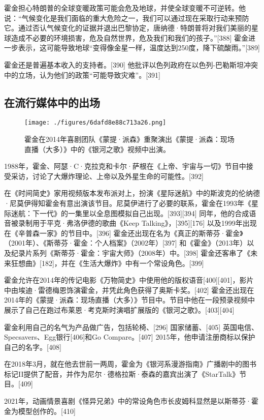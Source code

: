 霍金担心特朗普的全球变暖政策可能会危及地球，并使全球变暖不可逆转。他说：“气候变化是我们面临的重大危险之一，我们可以通过现在采取行动来预防它。通过否认气候变化的证据并退出巴黎协定，唐纳德·特朗普将对我们美丽的星球造成不必要的环境损害，危及自然世界，危及我们和我们的孩子。”[388] 霍金进一步表示，这可能导致地球“变得像金星一样，温度达到250度，降下硫酸雨。”[389]

霍金还是普遍基本收入的支持者。[390] 他批评以色列政府在以色列-巴勒斯坦冲突中的立场，认为他们的政策“可能导致灾难”。[391]
\subsection{在流行媒体中的出场}
\begin{figure}[ht]
\centering
\texttt{[image: ./figures/6dafd8e88c713a26.png]}
\caption{霍金在2014年喜剧团队《蒙提·派森》重聚演出《蒙提·派森：现场直播（大多）》中的《银河之歌》视频中出演。} \label{fig_HJ_9}
\end{figure}
1988年，霍金、阿瑟·C·克拉克和卡尔·萨根在《上帝、宇宙与一切》节目中接受采访，讨论了大爆炸理论、上帝以及外星生命的可能性。[392]

在《时间简史》家用视频版本发布派对上，扮演《星际迷航》中的斯波克的伦纳德·尼莫伊得知霍金有意出演该节目。尼莫伊进行了必要的联系，霍金在1993年《星际迷航：下一代》的一集里以全息图模拟自己出现。[393][394] 同年，他的合成语音被录制用于平克·弗洛伊德的歌曲《Keep Talking》，[395][176] 以及1999年出现在《辛普森一家》的节目中。[396] 霍金还出现在名为《真正的斯蒂芬·霍金》（2001年）、《斯蒂芬·霍金：个人档案》（2002年）[397] 和《霍金》（2013年）以及纪录片系列《斯蒂芬·霍金：宇宙大师》（2008年）中。[398] 霍金还客串了《未来狂想曲》[182]，并在《生活大爆炸》中有一个常设角色。[399]

霍金允许在2014年的传记电影《万物简史》中使用他的版权语音[400][401]，影片中由埃迪·雷德梅恩饰演霍金，并凭此角色获得了奥斯卡奖。[402] 霍金还出现在2014年的《蒙提·派森：现场直播（大多）》节目中。节目中他在一段预录视频中展示了自己在跑过布莱恩·考克斯时演唱扩展版的《银河之歌》。[403][404]

霍金利用自己的名气为产品做广告，包括轮椅、[296] 国家储蓄、[405] 英国电信、Specsavers、Egg银行[406]和Go Compare。[407] 2015年，他申请注册商标以保护自己的名字。[408]

在2018年3月，就在他去世前一两周，霍金为《银河系漫游指南》广播剧中的图书标记II提供了配音，并作为尼尔·德格拉斯·泰森的嘉宾出演了《StarTalk》节目。[409]

2021年，动画情景喜剧《怪异兄弟》中的常设角色市长皮姆科显然是以斯蒂芬·霍金为模型创作的。[410]

